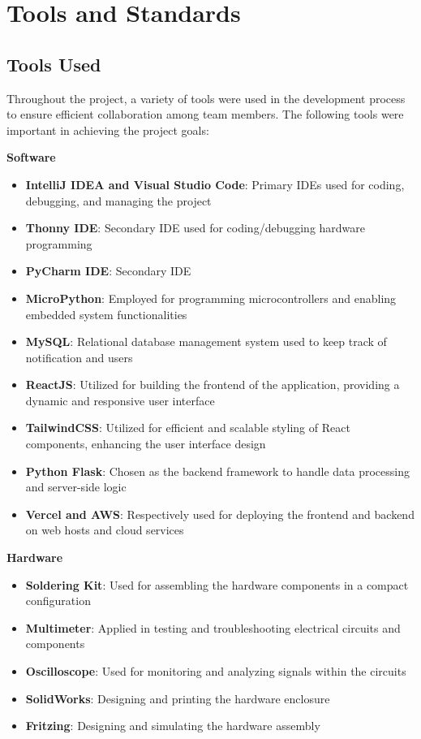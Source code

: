 \section{Tools and Standards}\label{sec:tools-and-standards}

\subsection{Tools Used}\label{subsec:tools-used}
Throughout the project, a variety of tools were used in the development process to
ensure efficient collaboration among team members. %
The following tools were important in achieving the project goals:

\textbf{Software}
\begin{itemize}
    \item \textbf{IntelliJ IDEA and Visual Studio Code}: Primary IDEs used for coding,
          debugging, and managing the project
    \item \textbf{Thonny IDE}: Secondary IDE used for coding/debugging hardware
          programming
    \item \textbf{PyCharm IDE}: Secondary IDE
    \item \textbf{MicroPython}: Employed for programming microcontrollers and enabling embedded system functionalities
    \item \textbf{MySQL}: Relational database management system used to keep track of notification and users
    \item \textbf{ReactJS}: Utilized for building the frontend of the application, providing a dynamic and responsive user interface
    \item \textbf{TailwindCSS}: Utilized for efficient and scalable styling of React components, enhancing the user interface design
    \item \textbf{Python Flask}: Chosen as the backend framework to handle data processing and server-side logic
    \item \textbf{Vercel and AWS}: Respectively used for deploying the frontend and backend on web hosts and cloud services
\end{itemize}

\textbf{Hardware}
\begin{itemize}
    \item \textbf{Soldering Kit}: Used for assembling the hardware components in a compact configuration
    \item \textbf{Multimeter}: Applied in testing and troubleshooting electrical circuits and components
    \item \textbf{Oscilloscope}: Used for monitoring and analyzing signals within the circuits
    \item \textbf{SolidWorks}: Designing and printing the hardware enclosure
    \item \textbf{Fritzing}: Designing and simulating the hardware assembly
\end{itemize}

